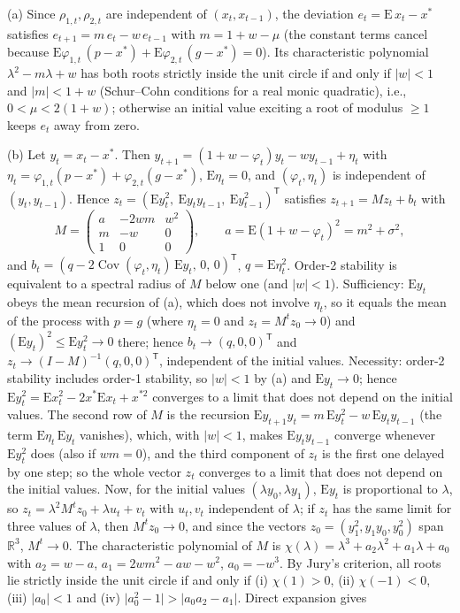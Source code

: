 \begin{thSproof}
(a) Since $\rho_{1,t},\rho_{2,t}$ are independent of $(x_t,x_{t-1})$, the deviation $e_t=\mathrm E\,x_t-x^*$ satisfies $e_{t+1}=m\,e_t-w\,e_{t-1}$ with $m=1+w-\mu$ (the constant terms cancel because $\mathrm E\varphi_{1,t}\,(p-x^*)+\mathrm E\varphi_{2,t}\,(g-x^*)=0$). Its characteristic polynomial $\lambda^2-m\lambda+w$ has both roots strictly inside the unit circle if and only if $\lvert w\rvert<1$ and $\lvert m\rvert<1+w$ (Schur--Cohn conditions for a real monic quadratic), i.e., $0<\mu<2(1+w)$; otherwise an initial value exciting a root of modulus $\ge1$ keeps $e_t$ away from zero.

(b) Let $y_t=x_t-x^*$. Then $y_{t+1}=(1+w-\varphi_t)y_t-wy_{t-1}+\eta_t$ with $\eta_t=\varphi_{1,t}(p-x^*)+\varphi_{2,t}(g-x^*)$, $\mathrm E\eta_t=0$, and $(\varphi_t,\eta_t)$ is independent of $(y_t,y_{t-1})$. Hence $z_t=(\mathrm Ey_t^2,\ \mathrm Ey_ty_{t-1},\ \mathrm Ey_{t-1}^2)^{\mathsf T}$ satisfies $z_{t+1}=Mz_t+b_t$ with
\begin{equation*}
M=\begin{pmatrix} a & -2wm & w^2\\ m & -w & 0\\ 1&0&0\end{pmatrix},\qquad a=\mathrm E(1+w-\varphi_t)^2=m^2+\sigma^2,
\end{equation*}
and $b_t=(q-2\operatorname{Cov}(\varphi_t,\eta_t)\,\mathrm Ey_t,\,0,\,0)^{\mathsf T}$, $q=\mathrm E\eta_t^2$. Order-2 stability is equivalent to a spectral radius of $M$ below one (and $\lvert w\rvert<1$). Sufficiency: $\mathrm Ey_t$ obeys the mean recursion of (a), which does not involve $\eta_t$, so it equals the mean of the process with $p=g$ (where $\eta_t=0$ and $z_t=M^tz_0\to0$) and $(\mathrm Ey_t)^2\le\mathrm Ey_t^2\to0$ there; hence $b_t\to(q,0,0)^{\mathsf T}$ and $z_t\to(I-M)^{-1}(q,0,0)^{\mathsf T}$, independent of the initial values. Necessity: order-2 stability includes order-1 stability, so $\lvert w\rvert<1$ by (a) and $\mathrm Ey_t\to0$; hence $\mathrm Ey_t^2=\mathrm Ex_t^2-2x^*\mathrm Ex_t+x^{*2}$ converges to a limit that does not depend on the initial values. The second row of $M$ is the recursion $\mathrm Ey_{t+1}y_t=m\,\mathrm Ey_t^2-w\,\mathrm Ey_ty_{t-1}$ (the term $\mathrm E\eta_t\,\mathrm Ey_t$ vanishes), which, with $\lvert w\rvert<1$, makes $\mathrm Ey_ty_{t-1}$ converge whenever $\mathrm Ey_t^2$ does (also if $wm=0$), and the third component of $z_t$ is the first one delayed by one step; so the whole vector $z_t$ converges to a limit that does not depend on the initial values. Now, for the initial values $(\lambda y_0,\lambda y_1)$, $\mathrm Ey_t$ is proportional to $\lambda$, so $z_t=\lambda^2M^tz_0+\lambda u_t+v_t$ with $u_t,v_t$ independent of $\lambda$; if $z_t$ has the same limit for three values of $\lambda$, then $M^tz_0\to0$, and since the vectors $z_0=(y_1^2,y_1y_0,y_0^2)$ span $\mathbb R^3$, $M^t\to0$. The characteristic polynomial of $M$ is $\chi(\lambda)=\lambda^3+a_2\lambda^2+a_1\lambda+a_0$ with $a_2=w-a$, $a_1=2wm^2-aw-w^2$, $a_0=-w^3$. By Jury's criterion, all roots lie strictly inside the unit circle if and only if (i) $\chi(1)>0$, (ii) $\chi(-1)<0$, (iii) $\lvert a_0\rvert<1$ and (iv) $\lvert a_0^2-1\rvert>\lvert a_0a_2-a_1\rvert$. Direct expansion gives

\end{thSproof}
